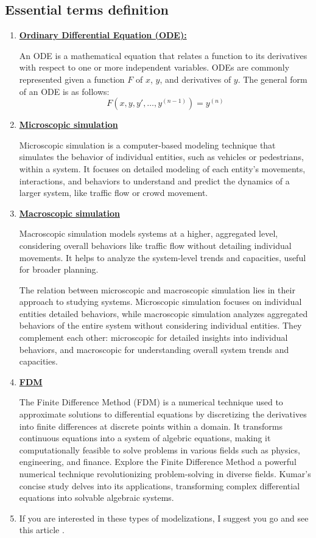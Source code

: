 \documentclass{article}
\begin{document}
 \subsection{Essential terms definition}
	\begin{enumerate}
		\item \textbf{\underline{Ordinary Differential Equation (ODE):}} 
		
		An ODE is a mathematical equation that relates a function to its derivatives with respect to one or more independent variables. ODEs are commonly represented given a function \( F \) of \( x \), \( y \), and derivatives of \( y \). The general form of an ODE is as follows:
		\[
		F\left(x,y,y',\ldots ,y^{(n-1)}\right)=y^{(n)}
		\]
		
		\item \textbf{\underline{Microscopic simulation}}
		
		Microscopic simulation is a computer-based modeling technique that simulates the behavior of individual entities, such as vehicles or pedestrians, within a system. It focuses on detailed modeling of each entity's movements, interactions, and behaviors to understand and predict the dynamics of a larger system, like traffic flow or crowd movement.
        \item \textbf{\underline{Macroscopic simulation}}
		
		Macroscopic simulation models systems at a higher, aggregated level, considering overall behaviors like traffic flow without detailing individual movements. It helps to analyze the system-level trends and capacities, useful for broader planning.
		
		The relation between microscopic and macroscopic simulation lies in their approach to studying systems. Microscopic simulation focuses on individual entities detailed behaviors, while macroscopic simulation analyzes aggregated behaviors of the entire system without considering individual entities. They complement each other: microscopic for detailed insights into individual behaviors, and macroscopic for understanding overall system trends and capacities.
		
		\item \textbf{\underline{FDM}}
		
		The Finite Difference Method (FDM) is a numerical technique used to approximate solutions to differential equations by discretizing the derivatives into finite differences at discrete points within a domain. It transforms continuous equations into a system of algebric equations, making it computationally feasible to solve problems in various fields such as physics, engineering, and finance.
	Explore the Finite Difference Method a powerful numerical technique revolutionizing problem-solving in diverse fields. Kumar's concise study delves into its applications, transforming complex differential equations into solvable algebraic systems. \cite{article}
		
		
		
		\item If you are interested in these types of modelizations, I suggest you go and see this article \cite{dugois:tel-01505473}.
	\end{enumerate}
\end{document}
